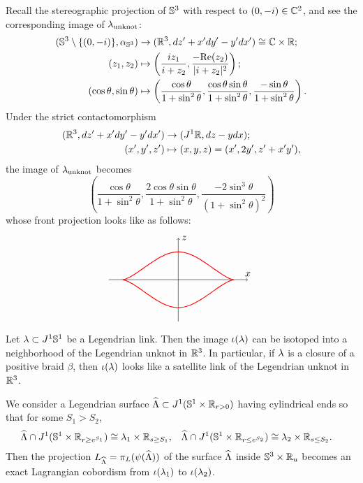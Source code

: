 Recall the stereographic projection of $\mathbb{S}^3$ with respect to $(0,-i)\in\mathbb{C}^2$, and see the corresponding image of $\lambda_{\rm unknot}$:
\begin{align*}
(\mathbb{S}^3\setminus \{(0,-i)\},\alpha_{\mathbb{S}^3}) &\to (\mathbb{R}^3,dz'+x'dy'-y'dx')\cong \mathbb{C}\times \mathbb{R};\\
(z_1,z_2)& \mapsto \left(\frac{i z_1}{i+z_2},\frac{-{\rm Re}(z_2)}{|i+z_2|^2}\right);\\
(\cos\theta,\sin\theta)&\mapsto \left(\frac{\cos\theta}{1+\sin^2\theta},\frac{\cos\theta\sin\theta}{1+\sin^2\theta},\frac{-\sin\theta}{1+\sin^2\theta}\right).
\end{align*}
Under the strict contactomorphism
\begin{align*}
(\mathbb{R}^3,dz'+x'dy'-y'dx') &\to (J^1\mathbb{R},dz-ydx);\\
(x',y',z') &\mapsto (x,y,z)=(x',2y',z'+x'y'),
\end{align*}
the image of $\lambda_{\rm unknot}$ becomes
\[
\left( \frac{\cos\theta}{1+\sin^2\theta},\frac{2\cos\theta\sin\theta}{1+\sin^2\theta},\frac{-2\sin^3\theta}{(1+\sin^2\theta)^2} \right)
\]
whose front projection looks like as follows:
\[
\begin{tikzpicture}[baseline=-.5ex, scale=2]
\draw[->] (-1.25,0) -- (1.25,0) node[above] {$x$};
\draw[->] (0,-0.75) -- (0,0.75) node[right] {$z$};
\draw[thick, red] plot[domain=0:2*pi, samples=200] ({cos(\x r)/ (1+ sin(\x r)^2)}, {-2*sin(\x r)^3/(1+sin(\x r)^2)^2});
\end{tikzpicture}
\]

Let $\lambda\subset J^1\mathbb{S}^1$ be a Legendrian link.
Then the image $\iota(\lambda)$ can be isotoped into a neighborhood of the Legendrian unknot in $\mathbb{R}^3$.
In particular, if $\lambda$ is a closure of a positive braid $\beta$, then $\iota(\lambda)$ looks like a satellite link of the Legendrian unknot in $\mathbb{R}^3$.

We consider a Legendrian surface $\widehat{\Lambda} \subset J^1(\mathbb{S}^1\times \mathbb{R}_{r>0})$ having cylindrical ends so that for some $S_1>S_2$,
\begin{align*}
\widehat{\Lambda} \cap J^1(\mathbb{S}^1\times\mathbb{R}_{r\ge e^{S_1}}) &\cong \lambda_1\times\mathbb{R}_{s\ge S_1},&
\widehat{\Lambda} \cap J^1(\mathbb{S}^1\times\mathbb{R}_{r\le e^{S_2}}) &\cong \lambda_2\times\mathbb{R}_{s\le S_2}.
\end{align*}
Then the projection $L_{\widehat{\Lambda}}=\pi_L(\psi(\widehat{\Lambda}))$ of the surface $\widehat{\Lambda}$ inside $\mathbb{S}^3\times\mathbb{R}_u$ becomes an exact Lagrangian cobordism from $\iota(\lambda_1)$ to $\iota(\lambda_2)$.

